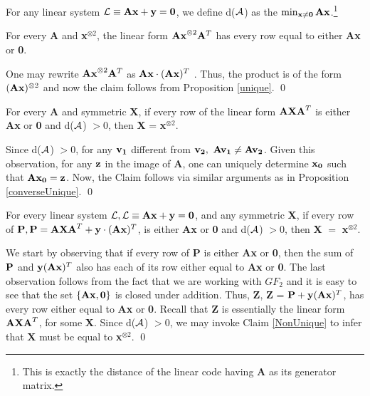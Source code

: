 \noindent For any linear system ${\cal L} \equiv {\bf Ax} + {\bf y} = {\bf 0}$, we define d(${\cal A}$) as
the $\min_{{\bf x} \ne {\bf 0}} {\bf Ax}$.\footnote{This is exactly
  the distance of the linear code having {\bf A} as its generator
  matrix.}

\begin{claim}
  For every {\bf A} and {\bf x}$^{\otimes 2}$, the linear form ${\bf
    Ax}^{\otimes 2}{\bf A}^T$ has every row equal to either {\bf Ax}
  or {\bf 0}.
\end{claim}
 One may rewrite ${\bf Ax}^{\otimes 2}{\bf A}^T$  as 
${\bf Ax}\cdot ({\bf Ax})^T$ . Thus, the product is of the form $({\bf  Ax})^{\otimes 2}$ 
and now the claim follows from Proposition \ref{unique}. \qed



\begin{claim} \label{NonUnique}
For every {\bf A} and symmetric {\bf X}, if every row of the linear 
form ${\bf AXA}^T$ is either {\bf Ax} or {\bf 0} and d(${\cal A}$) $ > 0$, then 
{\bf X} = {\bf x}$^{\otimes 2}$.
\end{claim}
 Since d(${\cal A}$) $> 0$, for any ${\bf v_1}$ different from ${\bf v_2},\ {\bf Av_1} \ne {\bf Av_2}$. 
Given this observation, for any ${\bf z}$ in the image of {\bf A}, one
can uniquely determine ${\bf x_0}$ such that ${\bf Ax_0} = {\bf z}$. 
Now, the Claim follows via similar arguments as in Proposition 
\ref{converseUnique}. \qed\\

	
\begin{claim} \label{claim:Punique}
For every linear system ${\cal L}, {\cal L} \equiv {\bf Ax} + {\bf y} = {\bf 0}$, and any symmetric {\bf X},
if every row of ${\bf P}, {\bf P} = {\bf AXA}^T + {\bf y}  
\cdot ({\bf Ax})^T$, is either {\bf Ax} or {\bf 0} and d(${\cal A}$)  $> 0$, 
then {\bf X} $=$ {\bf x}$^{\otimes 2}$. 
\end{claim}
  We start by observing that if every row of
{\bf P} is either {\bf Ax} or {\bf 0}, then the sum of ${\bf P}$ and
${\bf y}({\bf Ax})^T$ also has each of its row either equal to {\bf
  Ax} or {\bf 0}.  The last observation follows from the fact that we
are working with ${GF}_2$ and it is easy to see that the set
$\{{\bf Ax}, {\bf 0}\}$ is closed under addition. Thus, {\bf Z}, {\bf
  Z} = ${\bf P} + {\bf y}({\bf Ax})^T$, has every row either equal to
{\bf Ax} or {\bf 0}.  Recall that {\bf Z} is essentially the linear
form ${\bf AXA}^T$, for some {\bf X}. Since d(${\cal A}$) $> 0$,  we may invoke
 Claim \ref{NonUnique} to infer that {\bf X} must be equal to {\bf x}$^{\otimes 2}$.  \qed

